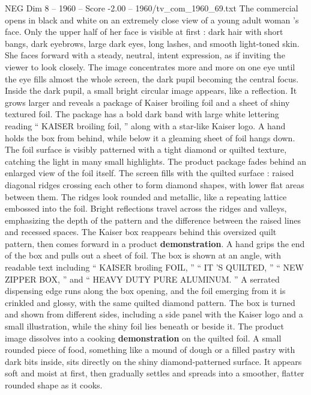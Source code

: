 \begin{textsample}{NEG Dim 8 – 1960 – Score -2.00 – 1960/tv\_com\_1960\_69.txt}  \label{ex:f8_neg_015}
The commercial opens in black and white on an extremely close view of a young adult woman ’s face.
Only the upper half of her face is visible at first : dark hair with short bangs, dark eyebrows, large dark eyes, long lashes, and smooth light-toned skin.
She faces forward with a steady, neutral, intent expression, as if inviting the viewer to look closely.
The image concentrates more and more on one eye until the eye fills almost the whole screen, the dark pupil becoming the central focus.
Inside the dark pupil, a small bright circular image appears, like a reflection.
It grows larger and reveals a package of Kaiser broiling foil and a sheet of shiny textured foil.
The package has a bold dark band with large white lettering reading “ KAISER broiling foil, ” along with a star-like Kaiser logo.
A hand holds the box from behind, while below it a gleaming sheet of foil hangs down.
The foil surface is visibly patterned with a tight diamond or quilted texture, catching the light in many small highlights.
The product package fades behind an enlarged view of the foil itself.
The screen fills with the quilted surface : raised diagonal ridges crossing each other to form diamond shapes, with lower flat areas between them.
The ridges look rounded and metallic, like a repeating lattice embossed into the foil.
Bright reflections travel across the ridges and valleys, emphasizing the depth of the pattern and the difference between the raised lines and recessed spaces.
The Kaiser box reappears behind this oversized quilt pattern, then comes forward in a product \textbf{demonstration}.
A hand grips the end of the box and pulls out a sheet of foil.
The box is shown at an angle, with readable text including “ KAISER broiling FOIL, ” “ IT ’S QUILTED, ” “ NEW ZIPPER BOX, ” and “ HEAVY DUTY PURE ALUMINUM. ” A serrated dispensing edge runs along the box opening, and the foil emerging from it is crinkled and glossy, with the same quilted diamond pattern.
The box is turned and shown from different sides, including a side panel with the Kaiser logo and a small illustration, while the shiny foil lies beneath or beside it.
The product image dissolves into a cooking \textbf{demonstration} on the quilted foil.
A small rounded piece of food, something like a mound of dough or a filled pastry with dark bits inside, sits directly on the shiny diamond-patterned surface.
It appears soft and moist at first, then gradually settles and spreads into a smoother, flatter rounded shape as it cooks.

\end{textsample}
